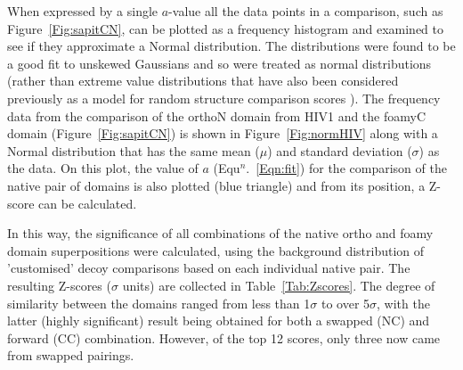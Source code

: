 \documentclass[12pt]{article}
\newcommand{\Eqn}[1]{Equ$^n$.~\ref{Eqn:#1}}
\newcommand{\Tab}[1]{Table~\ref{Tab:#1}}
\newcommand{\Fig}[1]{Figure~\ref{Fig:#1}}
\newcommand{\3}{$3_{10}$}
\begin{document}
When expressed by a single $a$-value
all the data points in a comparison, such as \Fig{sapitCN},
can be plotted as a frequency histogram and examined to see if they approximate a Normal
distribution.   The distributions were found to be a good fit to unskewed Gaussians and
so were treated as normal distributions (rather than extreme value distributions
that have also been considered previously as a model for random structure comparison scores
\cite{LevittMet98,TaylorWR06a}).    The frequency data from the comparison of the orthoN domain from
HIV1 and the foamyC domain (\Fig{sapitCN}) is shown in \Fig{normHIV} along with a Normal  
distribution that has the same mean ($\mu$) and standard deviation ($\sigma$) as the data.
On this plot, the value of $a$ (\Eqn{fit}) for the comparison of the
native pair of domains is also plotted (blue triangle) and from its position, a Z-score
can be calculated.

In this way, the significance of all combinations of the native ortho and foamy domain
superpositions were calculated, using the background distribution of 'customised' decoy
comparisons based on each individual native pair.   The resulting Z-scores ($\sigma$ units)
are collected in \Tab{Zscores}.   The degree of similarity between the domains ranged from
less than 1$\sigma$ to over 5$\sigma$, with the latter (highly significant) result being
obtained for both a swapped (NC) and forward (CC) combination.   However, of the top 12
scores, only three now came from swapped pairings. 
\end{document}
